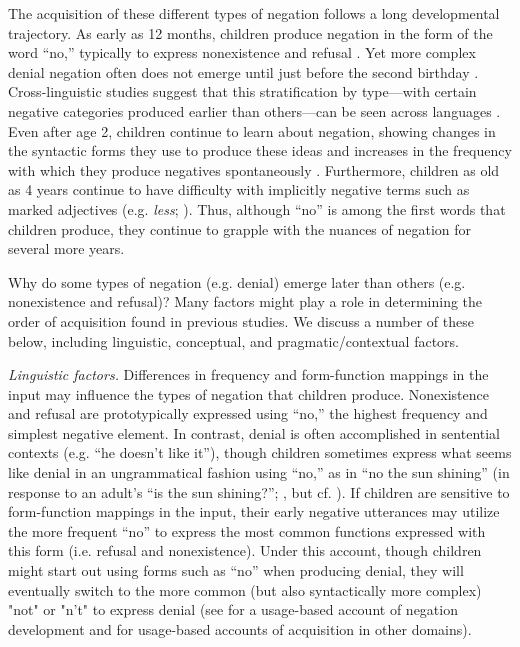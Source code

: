 \documentclass[man]{apa2}
\begin{document}
The acquisition of these different types of negation follows a long developmental trajectory. As early as 12 months, children produce negation in the form of the word ``no,'' typically to express nonexistence and refusal \cite{bloom1970, bloom1993, pea1980}.  Yet more complex denial negation often does not emerge until just before the second birthday  \cite{pea1980}.  Cross-linguistic studies suggest that this stratification by type---with certain negative categories produced earlier than others---can be seen across languages \cite{mcneill1968}.  
Even after age 2, children continue to learn about negation, showing changes in the syntactic forms they use to produce these ideas \cite{klima1966, cameron2007} and increases in the frequency with which they produce negatives spontaneously \cite{pea1982}.   Furthermore, children as old as 4 years continue to have difficulty with implicitly negative terms such as marked adjectives (e.g. \emph{less}; ).  Thus, although ``no'' is among the first words that children produce, they continue to grapple with the nuances of negation for several more years.  

Why do some types of negation (e.g. denial) emerge later than others (e.g. nonexistence and refusal)? Many factors might play a role in determining the order of acquisition found in previous studies. We discuss a number of these below, including linguistic, conceptual, and pragmatic/contextual factors.

{\it Linguistic factors.} Differences in frequency and form-function mappings in the input may influence the types of negation that children produce.  Nonexistence and refusal are prototypically expressed using ``no,'' the highest frequency and simplest negative element. In contrast, denial is often accomplished in sentential contexts (e.g. ``he doesn't like it''), though children sometimes express what seems like denial in an ungrammatical fashion using ``no,'' as in ``no the sun shining'' (in response to an adult's ``is the sun shining?''; , but cf. ).  If children are sensitive to form-function mappings in the input, their early negative utterances may utilize the more frequent ``no'' to express the most common functions expressed with this form (i.e. refusal and nonexistence).  Under this account, though children might start out using forms such as ``no'' when producing denial, they will eventually switch to the more common (but also syntactically more complex) "not" or "n't" to express denial (see  for a usage-based account of negation development and  for usage-based accounts of acquisition in other domains).  
\end{document}
